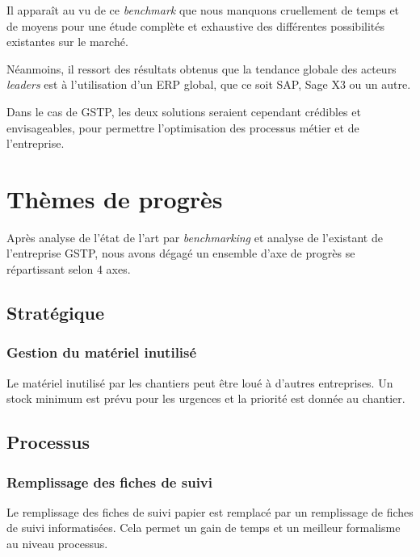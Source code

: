 \documentclass[twoside]{article}
\begin{document}
Il apparaît au vu de ce {\sl benchmark} que nous manquons
cruellement de temps et de moyens pour une étude complète
et exhaustive des différentes possibilités existantes sur le
marché.

Néanmoins, il ressort des résultats obtenus que la tendance
globale des acteurs {\sl leaders} est à l'utilisation d'un
ERP global, que ce soit SAP, Sage X3 ou un autre.

Dans le cas de GSTP, les deux solutions seraient cependant
crédibles et envisageables, pour permettre l'optimisation des
processus métier et de l'entreprise.

\vfill
\pagebreak


\section{Thèmes de progrès}

Après analyse de l'état de l'art par {\sl benchmarking} et analyse de l'existant
de l'entreprise GSTP, nous avons dégagé un ensemble d'axe de progrès se 
répartissant selon 4 axes.


\subsection{Stratégique}
\subsubsection{Gestion du matériel inutilisé}

Le matériel inutilisé par les chantiers peut être loué à d’autres entreprises.
Un stock minimum est prévu pour les urgences et la priorité est donnée au chantier.


\subsection{Processus}
 
\subsubsection{Remplissage des fiches de suivi}

Le remplissage des fiches de suivi papier est remplacé par un remplissage de 
fiches de suivi informatisées. 
Cela permet un gain de temps et un meilleur formalisme au niveau processus.
\end{document}
